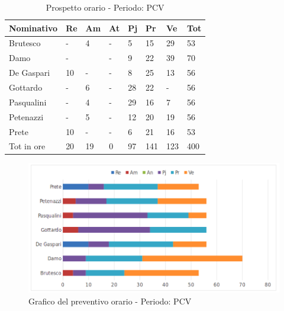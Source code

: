 							\begin{table}[H] \begin{center} \begin{tabular}{llllllll}
							\toprule
							\textbf{Nominativo}	&	\textbf{Re}	&	\textbf{Am}	&	\textbf{At}	&	\textbf{Pj}	&	\textbf{Pr}	&	\textbf{Ve}	&	\textbf{Tot}\\
							\midrule
							Brutesco	&	-	&	4	&	-	&	5	&	15	&	29	&	53	 \\ 
							Damo	&	-	&		&	-	&	9	&	22	&	39	&	70	 \\ 
							De Gaspari	&	10	&	-	&	-	&	8	&	25	&	13	&	56	 \\ 
							Gottardo	&	-	&	6	&	-	&	28	&	22	&	-	&	56	 \\ 
							Pasqualini	&	-	&	4	&	-	&	29	&	16	&	7	&	56	 \\ 
							Petenazzi	&	-	&	5	&	-	&	12	&	20	&	19	&	56	 \\ 
							Prete	&	10	&	-	&	-	&	6	&	21	&	16	&	53	 \\ 
							\midrule															
							Tot in ore	&	20	&	19	&	0	&	97	&	141	&	123	&	400	 \\ 
							


							\bottomrule
							\end{tabular} \end{center} \caption{Prospetto orario - Periodo:
							PCV
							}\label{tab:h_PCV} \end{table}		\begin{figure}[H]  \centering  \includegraphics[scale=0.37]{img/h_PCV}
									\caption{Grafico del preventivo orario - Periodo: 								PCV	}  \label{fig:h_PCV} \end{figure}

